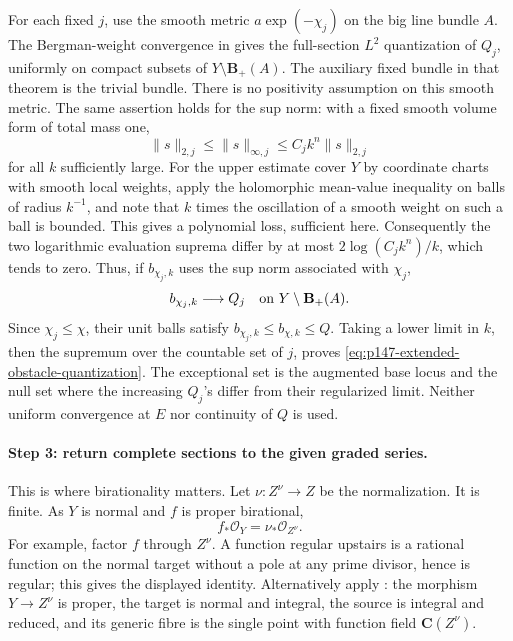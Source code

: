 For each fixed \(j\), use the smooth metric \(a\exp(-\chi_j)\) on the big
line bundle \(A\).
The Bergman-weight convergence in \cite[Theorem~1.4]{Berman07} gives
the full-section \(L^2\) quantization of \(Q_j\), uniformly on compact
subsets of \(Y\setminus\mathbf B_+(A)\).
The auxiliary fixed bundle in that theorem is the trivial bundle.
There is no positivity assumption on this smooth metric.
The same assertion holds for the sup norm: with a fixed smooth volume
form of total mass one,
\[
 \|s\|_{2,j}\leq\|s\|_{\infty,j}
       \leq C_j k^n\|s\|_{2,j}
\]
for all \(k\) sufficiently large.  For the upper estimate cover \(Y\)
by coordinate charts with smooth local weights, apply the holomorphic
mean-value inequality on balls of radius \(k^{-1}\), and note that
\(k\) times the oscillation of a smooth weight on such a ball is bounded.
This gives a polynomial loss, sufficient here.
Consequently the two logarithmic evaluation suprema differ by at most
\(2\log(C_jk^n)/k\), which tends to zero.
Thus, if \(b_{\chi_j,k}\) uses the sup norm associated with \(\chi_j\),
\[
                  b_{\chi_j,k}\longrightarrow Q_j
             \quad\hbox{on }Y\setminus\mathbf B_+(A).
\]
Since \(\chi_j\leq\chi\), their unit balls satisfy
\(b_{\chi_j,k}\leq b_{\chi,k}\leq Q\).
Taking a lower limit in \(k\), then the supremum over the countable set
of \(j\), proves \eqref{eq:p147-extended-obstacle-quantization}.
The exceptional set is the augmented base locus and the null set where
the increasing \(Q_j\)'s differ from their regularized limit.
Neither uniform convergence at \(E\) nor continuity of \(Q\) is used.

\paragraph{Step 3: return complete sections to the given graded series.}
This is where birationality matters.
Let \(\nu:Z^\nu\to Z\) be the normalization.  It is finite.
As \(Y\) is normal and \(f\) is proper birational,
\[
                         f_*\mathcal O_Y=\nu_*\mathcal O_{Z^\nu}.
\]
For example, factor \(f\) through \(Z^\nu\).
A function regular upstairs is a rational function on the normal target
without a pole at any prime divisor, hence is regular; this gives the
displayed identity.  Alternatively apply \cite[Tag~0AY8]{StacksBirational}:
the morphism \(Y\to Z^\nu\) is proper, the target is normal and integral,
the source is integral and reduced, and its generic fibre is the single
point with function field \(\mathbf C(Z^\nu)\).

